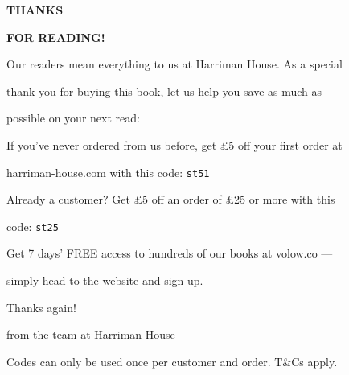 \clearpage \thispagestyle{empty} \begin{center}
{\Large\bfseries THANKS\par}
\smallskip
{\Large\bfseries FOR READING!\par}
\vspace{1.5em} Our readers mean everything to us at Harriman House. As a special \par thank you for buying this book, let us help you save as much as \par possible on your next read: \par \vspace{1.5em} If you've never ordered from us before, get \pounds5 off your first order at \par harriman-house.com with this code: \texttt{st51} \par \vspace{1em} Already a customer? Get \pounds5 off an order of \pounds25 or more with this \par code: \texttt{st25} \par \vspace{1em} Get 7 days' FREE access to hundreds of our books at volow.co --- \par simply head to the website and sign up. \par \vspace{1.5em} Thanks again! \par from the team at Harriman House \par \vfill
{\footnotesize Codes can only be used once per customer and order. T\&Cs apply.\par}
\end{center}
